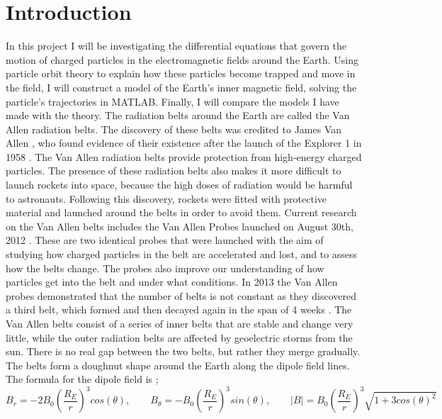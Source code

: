\documentclass[14paper,11pt,hidelinks]{article}
\begin{document}
\section{Introduction}
In this project I will be investigating the differential equations that govern the motion of charged particles in the electromagnetic fields around the Earth. Using particle orbit theory to explain how these particles become trapped and move in the field, I will construct a model of the Earth's inner magnetic field, solving the particle's trajectories in MATLAB. Finally, I will compare the models I have made with the theory.
\newline
\newline
The radiation belts around the Earth are called the Van Allen radiation belts. The discovery of these belts was credited to James Van Allen \citep{van_allen_observation_1958}, who found evidence of their existence after the launch of the Explorer 1 in 1958 \citep{garner_studying_2018}. The Van Allen radiation belts provide protection from high-energy charged particles. The presence of these radiation belts also makes it more difficult to launch rockets into space, because the high doses of radiation would be harmful to astronauts. Following this discovery, rockets were fitted with protective material and launched around the belts in order to avoid them.
\newline
\newline
Current research on the Van Allen belts includes the Van Allen Probes launched on August 30th, 2012 \citep{zell_van_2017}. These are two identical probes that were launched with the aim of studying how charged particles in the belt are accelerated and lost, and to assess how the belts change. The probes also improve our understanding of how particles get into the belt and under what conditions. In 2013 the Van Allen probes demonstrated that the number of belts is not constant as they discovered a third belt, which formed and then decayed again in the span of 4 weeks \citep{zell_van_2017}.
\newline
\newline
The Van Allen belts consist of a series of inner belts that are stable and change very little, while the outer radiation belts are affected by geoelectric storms from the sun. There is no real gap between the two belts, but rather they merge gradually. The belts form a doughnut shape around the Earth along the dipole field lines. The formula for the dipole field is \citep{walt_introduction_2005};
\begin{equation}
B_r=-2B_0\left(\frac{R_E}{r}\right)^3cos(\theta),
\qquad 
B_\theta=-B_0\left(\frac{R_E}{r}\right)^3sin(\theta),
\qquad
|B|=B_0\left(\frac{R_E}{r}\right)^3\sqrt{1+3cos(\theta)^2}
\end{equation}
\end{document}
